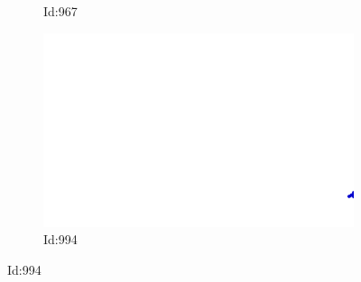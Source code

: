 \documentclass[12pt,twoside]{report}
\begin{document}
\begin{figure}
\begin{subfigure}[b]{0.20\textwidth}
\caption{Id:967}
\end{subfigure}
\begin{subfigure}[b]{0.20\textwidth}
\centering
\includegraphics[width=\textwidth]{../trajectories/994.png}
\caption{Id:994}
\end{subfigure}
\end{figure}
\end{document}
